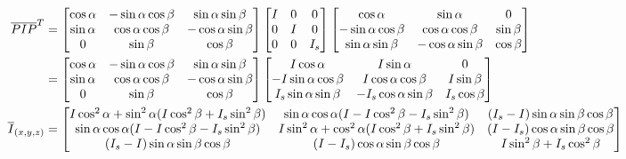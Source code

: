 \documentclass[10pt]{article}
\begin{document}
\begin{align}
    \overline{P}\overline{I}\overline{P}^T &=
    \begin{bmatrix}
        \cos\alpha & -\sin\alpha\cos\beta & \sin\alpha\sin\beta \\
        \sin\alpha & \cos\alpha\cos\beta & -\cos\alpha\sin\beta \\
        0 & \sin\beta & \cos\beta
    \end{bmatrix}
    \begin{bmatrix}
        I & 0 & 0 \\
        0 & I & 0 \\
        0 & 0 & I_s
    \end{bmatrix}
    \begin{bmatrix}
        \cos\alpha & \sin\alpha & 0 \\
        -\sin\alpha\cos\beta & \cos\alpha\cos\beta & \sin\beta \\
        \sin\alpha\sin\beta & -\cos\alpha\sin\beta & \cos\beta
    \end{bmatrix}
    \notag\\
    &=
    \begin{bmatrix}
        \cos\alpha & -\sin\alpha\cos\beta & \sin\alpha\sin\beta \\
        \sin\alpha & \cos\alpha\cos\beta & -\cos\alpha\sin\beta \\
        0 & \sin\beta & \cos\beta
    \end{bmatrix}
    \begin{bmatrix}
        I\cos\alpha & I\sin\alpha & 0 \\
        -I\sin\alpha\cos\beta & I\cos\alpha\cos\beta & I\sin\beta \\
        I_s\sin\alpha\sin\beta & -I_s\cos\alpha\sin\beta & I_s\cos\beta
    \end{bmatrix}
    \notag \\
    \overline{I}_{(x,y,z)}&=
    \begin{bmatrix}
        I\cos^2\alpha + \sin^2\alpha(I\cos^2\beta +I_s\sin^2\beta)
            & \sin\alpha\cos\alpha(I-I\cos^2\beta-I_s\sin^2\beta)
            & (I_s-I)\sin\alpha\sin\beta\cos\beta \\
        \sin\alpha\cos\alpha(I - I\cos^2\beta - I_s\sin^2\beta)
            & I\sin^2\alpha+\cos^2\alpha(I\cos^2\beta+I_s\sin^2\beta)
            & (I-I_s)\cos\alpha\sin\beta\cos\beta \\
        (I_s-I)\sin\alpha\sin\beta\cos\beta 
            & (I-I_s)\cos\alpha\sin\beta\cos\beta
            & I\sin^2\beta+I_s\cos^2\beta
    \end{bmatrix}
\end{align}
\end{document}
